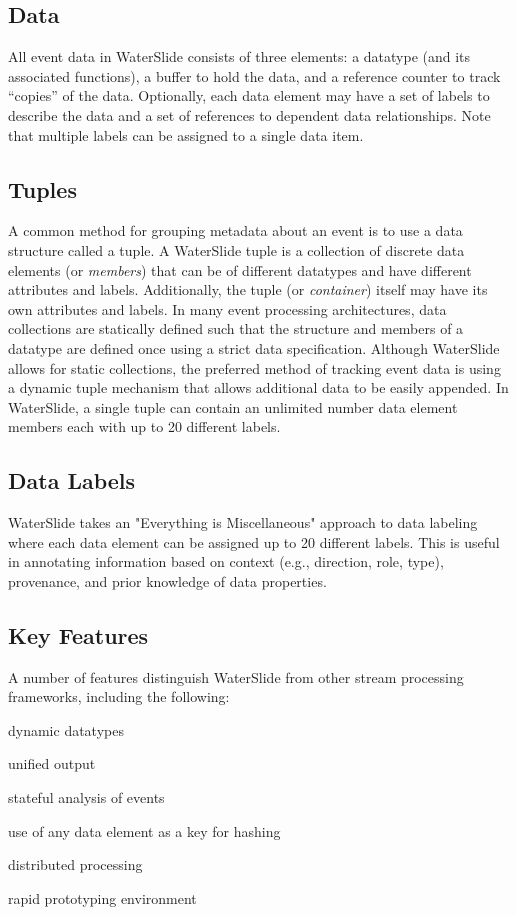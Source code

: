 \documentclass[11pt]{article}
\begin{document}
\subsection{Data}
All event data in WaterSlide consists of three elements: a datatype (and its associated functions), a buffer to hold the data, and a
reference counter to track ``copies'' of the data. Optionally, each data element may have a set of labels to describe the data and a
set of references to dependent data relationships. 
 Note that multiple labels can be assigned to a single data item. 

\subsection{Tuples}
A common method for grouping metadata about an event is to use a data structure called a tuple.  A
WaterSlide tuple is
a collection of discrete data elements (or \emph{members}) that can be of different datatypes and have different
attributes and labels. Additionally, the tuple (or \emph{container}) itself may have its own
attributes and labels. In many event processing architectures, data collections are
statically defined such that the structure and members of a datatype are defined once using a strict
data specification.  Although WaterSlide allows for static collections, the preferred method of tracking
event data is using a dynamic tuple mechanism that allows additional data to be easily appended. 
In WaterSlide, a single tuple can contain an unlimited number data element members each with up to 20 different labels.

\subsection{Data Labels}
WaterSlide takes an "Everything is Miscellaneous" approach to data labeling where each data element can be
assigned up to 20 different labels.  This is useful in annotating information based on
context (e.g., direction, role, type), provenance, and prior knowledge of data properties.

\subsection{Key Features}
A number of features distinguish WaterSlide from other stream processing frameworks,
including the following:
\begin{itemize*}
\item dynamic datatypes
\item unified output
\item stateful analysis of events
\item use of any data element as a key for hashing
\item distributed processing
\item rapid prototyping environment
\end{itemize*}
\end{document}
